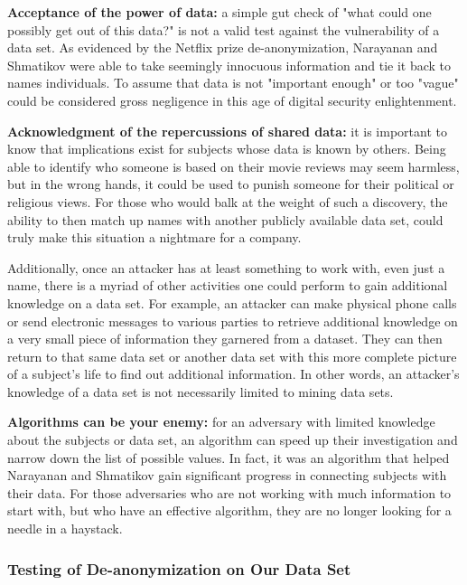 \documentclass[10pt,journal,compsoc]{IEEEtran}
\begin{document}
	\textbf{Acceptance of the power of data:}  a simple gut check of "what could one possibly get out of this data?" is not a valid test against the vulnerability of a data set.  As evidenced by the Netflix prize de-anonymization, Narayanan and Shmatikov were able to take seemingly innocuous information and tie it back to names individuals. \cite{narayanan}  To assume that data is not "important enough" or too "vague" could be considered gross negligence in this age of digital security enlightenment. \linebreak
	
	\textbf{Acknowledgment of the repercussions of shared data:} it is important to know that implications exist for subjects whose data is known by others.  Being able to identify who someone is based on their movie reviews may seem harmless, but in the wrong hands, it could be used to punish someone for their political or religious views.  For those who would balk at the weight of such a discovery, the ability to then match up names with another publicly available data set, could truly make this situation a nightmare for a company. 
	
	Additionally, once an attacker has at least something to work with, even just a name, there is a myriad of other activities one could perform to gain additional knowledge on a data set.  For example, an attacker can make physical phone calls or send electronic messages to various parties to retrieve additional knowledge on a very small piece of information they garnered from a dataset.  They can then return to that same data set or another data set with this more complete picture of a subject's life to find out additional information.  In other words, an attacker's knowledge of a data set is not necessarily limited to mining data sets.\linebreak
	
	\textbf{Algorithms can be your enemy:} for an adversary with limited knowledge about the subjects or data set, an algorithm can speed up their investigation and narrow down the list of possible values. In fact, it was an algorithm that helped Narayanan and Shmatikov gain significant progress in connecting subjects with their data.  For those adversaries who are not working with much information to start with, but who have an effective algorithm, they are no longer looking for a needle in a haystack.\linebreak

\subsubsection{Testing of De-anonymization on Our Data Set}
	
\end{document}
